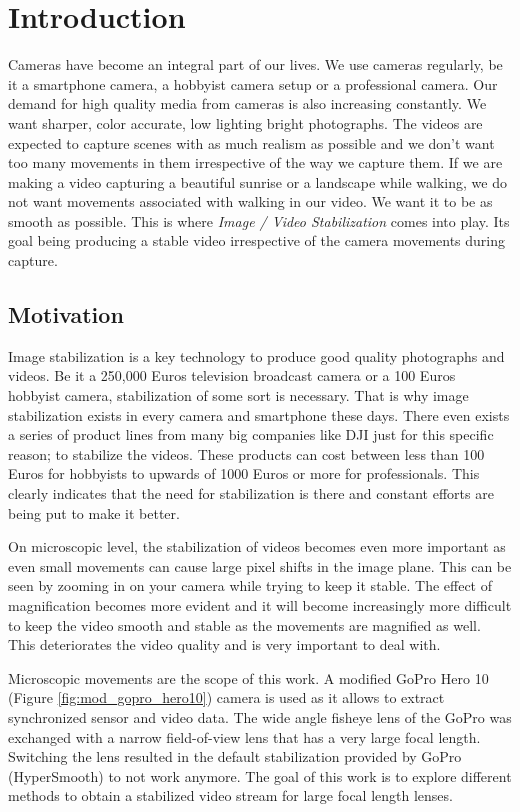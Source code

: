 \chapter{Introduction} \label{chapter_one}

Cameras have become an integral part of our lives. We use cameras regularly, be it a smartphone camera, a hobbyist camera setup or a professional camera. Our demand for high quality media from cameras is also increasing constantly. We want sharper, color accurate, low lighting bright photographs. The videos are expected to capture scenes with as much realism as possible and we don't want too many movements in them irrespective of the way we capture them. If we are making a video capturing a beautiful sunrise or a landscape while walking, we do not want movements associated with walking in our video. We want it to be as smooth as possible. This is where \textit{Image / Video Stabilization} comes into play. Its goal being producing a stable video irrespective of the camera movements during capture.

\section{Motivation}

Image stabilization is a key technology to produce  good quality photographs and videos. Be it a 250,000 Euros television broadcast camera or a 100 Euros hobbyist camera, stabilization of some sort is necessary. That is why image stabilization exists in every camera and smartphone these days. There even exists a series of product lines from many big companies like DJI just for this specific reason; to stabilize the videos. These products can cost between less than 100 Euros for hobbyists to upwards of 1000 Euros or more for professionals. This clearly indicates that the need for stabilization is there and constant efforts are being put to make it better.

On microscopic level, the stabilization of videos becomes even more important as even small movements can cause large pixel shifts in the image plane. This can be seen by zooming in on your camera while trying to keep it stable. The effect of magnification becomes more evident and it will become increasingly more difficult to keep the video smooth and stable as the movements are magnified as well. This deteriorates the video quality and is very important to deal with. 

Microscopic movements are the scope of this work. A modified GoPro Hero 10 (Figure \ref{fig:mod_gopro_hero10}) camera is used as it allows to extract synchronized sensor and video data. The wide angle fisheye lens of the GoPro was exchanged with a narrow field-of-view lens that has a very large focal length. Switching the lens resulted in the default stabilization provided by GoPro (HyperSmooth) to not work anymore. The goal of this work is to explore different methods to obtain a stabilized video stream for large focal length lenses.

